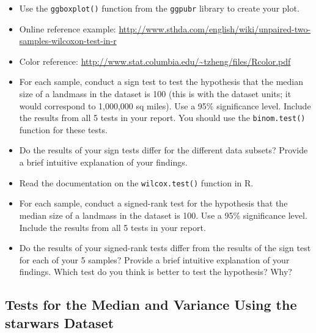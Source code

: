 \documentclass{article}
\begin{document}
\begin{itemize}
    \item Use the \texttt{ggboxplot()} function from the \texttt{ggpubr} library to create your plot.
    \item Online reference example: \url{http://www.sthda.com/english/wiki/unpaired-two-samples-wilcoxon-test-in-r}
    \item Color reference: \url{http://www.stat.columbia.edu/~tzheng/files/Rcolor.pdf}
    \item For each sample, conduct a sign test to test the hypothesis that the median size of a landmass in the dataset is 100 (this is with the dataset units; it would correspond to 1,000,000 sq miles). Use a 95\% significance level. Include the results from all 5 tests in your report. You should use the \texttt{binom.test()} function for these tests.
    \item Do the results of your sign tests differ for the different data subsets? Provide a brief intuitive explanation of your findings.
    \item Read the documentation on the \texttt{wilcox.test()} function in R.
    \item For each sample, conduct a signed-rank test for the hypothesis that the median size of a landmass in the dataset is 100. Use a 95\% significance level. Include the results from all 5 tests in your report.
    \item Do the results of your signed-rank tests differ from the results of the sign test for each of your 5 samples? Provide a brief intuitive explanation of your findings. Which test do you think is better to test the hypothesis? Why?
\end{itemize}

\subsection*{Tests for the Median and Variance Using the starwars Dataset}
\end{document}
